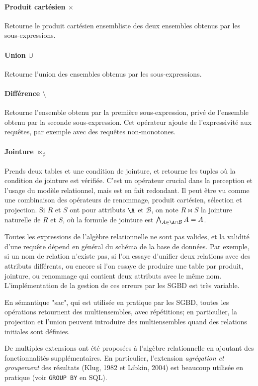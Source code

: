 \documentclass[french, toc]{../cs-classes/cs-classes}
\begin{document}
\paragraph*{Produit cartésien $\times$}
Retourne le produit cartésien ensembliste des deux ensembles obtenus par les sous-expressions.
\paragraph*{Union $\cup$}
Retourne l'union des ensembles obtenus par les sous-expressions.
\paragraph*{Différence $\setminus$}
Retourne l'ensemble obtenu par la première sous-expression, privé de l'ensemble obtenu par la seconde sous-expression. Cet opérateur ajoute de l'expressivité aux requêtes, par exemple avec des requêtes non-monotones.
\paragraph*{Jointure $\bowtie_\phi$}
Prends deux tables et une condition de jointure, et retourne les tuples où la condition de jointure est vérifiée. C'est un opérateur crucial dans la perception et l'usage du modèle relationnel, mais est en fait redondant. Il peut être vu comme une combinaison des opérateurs de renommage, produit cartésien, sélection et projection.
Si $R$ et $S$ ont pour attributs $\A$ et $\mathcal{B}$, on note $R\bowtie S$ la jointure naturelle de $R$ et $S$, où la formule de jointure est $\bigwedge_{A\in\A\cap \mathcal{B}}A=A$.

Toutes les expressions de l'algèbre relationnelle ne sont pas valides, et la validité d'une requête dépend en général du schéma de la base de données. Par exemple, si un nom de relation n'existe pas, si l'on essaye d'unifier deux relations avec des attributs différents, ou encore si l'on essaye de produire une table par produit, jointure, ou renommage qui contient deux attributs avec le même nom. L'implémentation de la gestion de ces erreurs par les SGBD est très variable.

En sémantique "sac", qui est utilisée en pratique par les SGBD, toutes les opérations retournent des multiensembles, avec répétitions; en particulier, la projection et l'union peuvent introduire des multiensembles quand des relations initiales sont définies.

De multiples extensions ont été proposées à l'algèbre relationnelle en ajoutant des fonctionnalités supplémentaires. En particulier, l'extension \emph{agrégation et groupement} des résultats (Klug, 1982 et Libkin, 2004) est beaucoup utilisée en pratique (voir \texttt{GROUP BY} en SQL).
\end{document}
